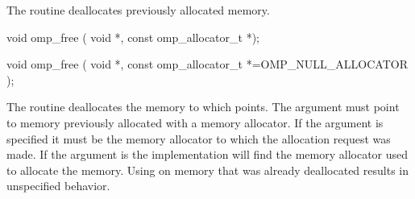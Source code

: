 \begin{ccppspecific}
\summary
The  routine deallocates previously allocated memory.

\format

\begin{cspecific}
\begin{ompcFunction}
void omp_free ( void *, const omp_allocator_t *);
\end{ompcFunction}
\end{cspecific}
\begin{cppspecific}
\begin{ompcFunction}
void omp_free (
  void *,
  const omp_allocator_t *=OMP_NULL_ALLOCATOR
);
\end{ompcFunction}
\end{cppspecific}

\effect

The  routine deallocates the memory to which  points. The  argument must point to memory previously allocated with a memory allocator. If the  argument is specified it must be the memory allocator to which the allocation request was made. If the  argument is  the implementation will find the memory allocator used to allocate the memory. Using  on memory that was already deallocated results in unspecified behavior.

\end{ccppspecific}
